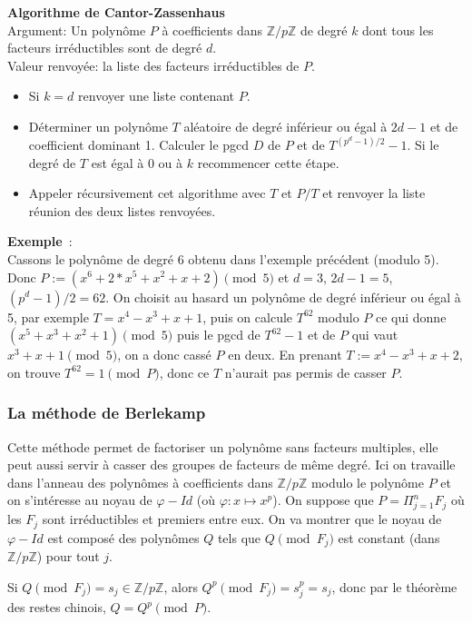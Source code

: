 \documentclass[a4paper,11pt]{article}
\newcommand{\Z}{{\mathbb{Z}}}
\begin{document}
{\bf Algorithme de Cantor-Zassenhaus}\\
Argument: Un polynôme $P$ à coefficients dans $\Z/p\Z$ de degré $k$
dont tous les facteurs irréductibles sont de degré $d$.\\
Valeur renvoyée: la liste des facteurs irréductibles de $P$.\\
\begin{itemize}
\item Si $k=d$ renvoyer une liste contenant $P$.
\item Déterminer un polynôme $T$ aléatoire de degré inférieur ou égal
à $2d-1$ et de coefficient dominant 1. Calculer le pgcd $D$ de $P$
et de $T^{(p^d-1)/2}-1$. Si le degré de $T$ est égal à 0 ou à $k$ 
recommencer cette étape.
\item Appeler récursivement cet algorithme avec $T$ et $P/T$ et
renvoyer la liste réunion des deux listes renvoyées.
\end{itemize}

{\bf Exemple}~:\\ 
Cassons le polynôme de degré 6 obtenu dans l'exemple précédent
(modulo 5). Donc $P:=(x^6+2*x^5+x^2+x+2) \pmod 5$ et $d=3$, $2d-1=5$,
$(p^{d}-1)/2=62$.
On choisit au hasard un polynôme de degré inférieur ou égal à 5, par exemple
$T=x^4-x^3+x+1$, puis on calcule $T^{62}$ modulo $P$ ce qui donne
$(x^5+x^3+x^2+1) \pmod 5$ puis le pgcd de $T^{62}-1$ et de $P$
qui vaut $x^3+x+1 \pmod 5$, on a donc cassé $P$ en deux. 
En prenant $T:=x^4-x^3+x+2$, on trouve $T^{62}=1 \pmod P$, donc
ce $T$ n'aurait pas permis de casser $P$.

\subsubsection{La méthode de Berlekamp}
Cette méthode permet de factoriser un polynôme sans facteurs multiples,
elle peut aussi servir à casser des groupes de facteurs de même degré.
Ici on travaille dans l'anneau des polynômes à coefficients dans $\Z/p\Z$
modulo le polynôme $P$ et on s'intéresse au noyau de $\varphi-Id$
(où $\varphi: x \mapsto x^p$). On
suppose que $P=\Pi_{j=1}^n F_j$ où les $F_j$ sont irréductibles et
premiers entre eux. On va montrer que le noyau de $\varphi-Id$ est
composé des polynômes $Q$ tels que $Q \pmod {F_j}$ est constant
(dans $\Z/p\Z$) pour tout $j$.

Si $Q \pmod {F_j}=s_j \in \Z/p\Z$, alors $Q^p \pmod {F_j}=s_j^p=s_j$, donc
par le théorème des restes chinois, $Q=Q^p \pmod P$. 
\end{document}
